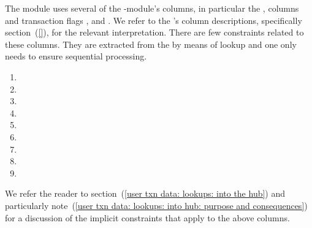The \txnDataMod{} module uses several of the \hubMod{}-module's columns, in particular
the \totalTransactionNumber{}, \userTransactionNumber{} columns and transaction flags \sysi{}, \user{} and \sysf{}.
We refer to the \hubMod{}'s column descriptions,
specifically section~(\ref{}),
for the relevant interpretation.
There are few constraints related to these columns.
They are extracted from the \hubMod{} by means of lookup
and one only needs to ensure sequential processing.
\begin{multicols}{3}
	\begin{enumerate}
		\item \blockNumber
		\item[\vspace{\fill}]
		\item[\vspace{\fill}]
		\item \totalTransactionNumber
		\item \userTransactionNumber
		\item[\vspace{\fill}]
		\item \sysi
		\item \user
		\item \sysf
	\end{enumerate}
\end{multicols}
\noindent We refer the reader to
section~(\ref{user txn data: lookups: into the hub}) and particularly
note~(\ref{user txn data: lookups: into hub: purpose and consequences})
for a discussion of the implicit constraints that apply to the above columns.

